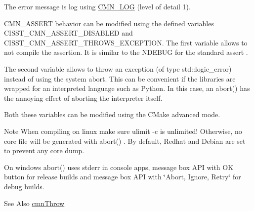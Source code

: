 \begin{DoxyItemize}
\item The error message is log using \hyperlink{cmn_logger_8h_a2eb3b40558ec17c9ae45197777aca7b2}{C\-M\-N\-\_\-\-L\-O\-G} (level of detail 1).\end{DoxyItemize}
\begin{DoxyItemize}
\item C\-M\-N\-\_\-\-A\-S\-S\-E\-R\-T behavior can be modified using the defined variables C\-I\-S\-S\-T\-\_\-\-C\-M\-N\-\_\-\-A\-S\-S\-E\-R\-T\-\_\-\-D\-I\-S\-A\-B\-L\-E\-D and C\-I\-S\-S\-T\-\_\-\-C\-M\-N\-\_\-\-A\-S\-S\-E\-R\-T\-\_\-\-T\-H\-R\-O\-W\-S\-\_\-\-E\-X\-C\-E\-P\-T\-I\-O\-N. The first variable allows to not compile the assertion. It is similar to the {\ttfamily N\-D\-E\-B\-U\-G} for the standard {\ttfamily assert} .\par
The second variable allows to throw an exception (of type {\ttfamily std\-::logic\-\_\-error}) instead of using the system {\ttfamily abort}. This can be convenient if the libraries are wrapped for an interpreted language such as Python. In this case, an {\ttfamily abort()} has the annoying effect of aborting the interpreter itself.\par
Both these variables can be modified using the C\-Make advanced mode.\end{DoxyItemize}
\begin{DoxyNote}{Note}
When compiling on linux make sure ulimit -\/c is unlimited! Otherwise, no core file will be generated with {\ttfamily abort()} . By default, Redhat and Debian are set to prevent any core dump.

On windows {\ttfamily abort()} uses stderr in console apps, message box A\-P\-I with O\-K button for release builds and message box A\-P\-I with \char`\"{}\-Abort, Ignore, Retry\char`\"{} for debug builds.
\end{DoxyNote}
\begin{DoxySeeAlso}{See Also}
\hyperlink{cmn_throw_8h_a6fe29a0b6f112fe0032896bb904f8377}{cmn\-Throw} 
\end{DoxySeeAlso}


